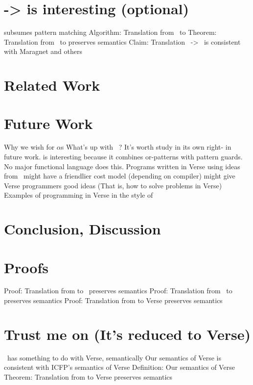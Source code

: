 \documentclass[manuscript,screen,review, 12pt]{acmart}
\begin{document}
\section{\PPlus -> \VMinus is interesting (optional)}
\begin{outline}[enumerate]
    \1 \VMinus subsumes pattern matching 
    \1 Algorithm: Translation from \PPlus\ to \VMinus
    \1 Theorem: Translation from \PPlus\ to \VMinus preserves semantics 
    \1 Claim: Translation \PPlus\ -> \D\ is consistent with Maragnet and others
\end{outline}

\section{Related Work}
\section{Future Work}
\begin{outline}[enumerate]
    \1 Why we wish for $\alpha$s
    \1 What's up with \PPlus\ ? It's worth study in its own right- in future work.
    \2 \PPlus is interesting because it combines or-patterns with pattern 
        guards. No major functional language does this. 
    \1 Programs written in Verse using ideas from \VMinus\ might have a 
    friendlier cost model (depending on compiler)
    \1 \VMinus might give Verse programmers good ideas 
        (That is, how to solve problems in Verse)
    \2 Examples of programming in Verse in the style of \VMinus 
\end{outline}

\section{Conclusion, Discussion}

\renewcommand\thesection{\Alph{section}}
\setcounter{section}{0}
\section{Proofs}
\begin{outline}
    \1 Proof: Translation from \VMinus to \D\ preserves semantics 
    \1 Proof: Translation from \PPlus\ to \VMinus preserves semantics 
    \1 Proof: Translation from \VMinus to Verse preserves semantics     
\end{outline}

\section{Trust me on \VMinus (It's reduced to Verse)}
\begin{outline}
    \1 \VMinus\ has something to do with Verse, semantically 
    \1 Our semantics of Verse is consistent with ICFP's semantics of Verse 
    \1 Definition: Our semantics of Verse
    \1 Theorem: Translation from \VMinus to Verse preserves semantics     
\end{outline}
\end{document}
